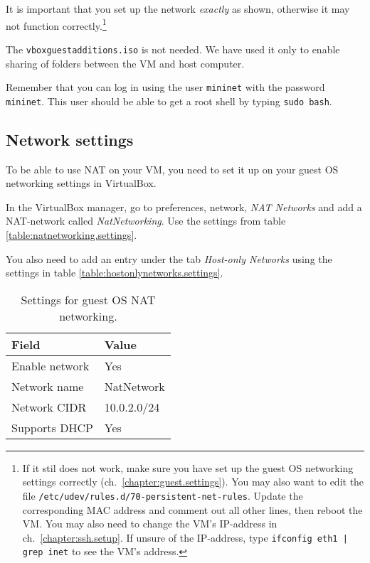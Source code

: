 It is important that you set up the network
\textit{exactly} as shown, otherwise it may not function correctly.\footnote{
  If it stil does not work, make sure you have set up the guest OS
    networking settings correctly (ch.~\vref{chapter:guest.settings}).
  You may also want to edit the file
  \texttt{/etc/udev/rules.d/70-persistent-net-rules}.
  Update the corresponding MAC address and comment out all other lines, then
  reboot the VM.
   You may also need to change the VM's IP-address in
  ch.~\vref{chapter:ssh.setup}. If unsure of the IP-address, type
  \texttt{ifconfig eth1 | grep inet} to see the VM's address.
}

The \texttt{vboxguestadditions.iso} is not needed. We have used it only to
enable sharing of folders between the VM and host computer.

Remember that you can log in using the user \texttt{mininet} with the
password \texttt{mininet}.  This user should be able to get a root shell by
typing \texttt{sudo bash}.

\subsection{Network settings}
\label{chapter:guest.settings}

To be able to use \ac{NAT} on your VM, you need to set it up on your guest
OS networking settings in VirtualBox.

In the VirtualBox manager, go to preferences, network, \textit{NAT Networks}
and add a \acs{NAT}-network called \textit{NatNetworking}. Use the settings
from table \vref{table:natnetworking.settings}.

You also need to add an entry under the tab \textit{Host-only Networks}
using the settings in table
\vref{table:hostonlynetworks.settings}.

\begin{table}[H]
  \centering
  \begin{tabular}{ll}
    \hline \textbf{Field} & \textbf{Value} \\
    \hline
      Enable network & Yes \\
      Network name & NatNetwork \\
      Network CIDR & 10.0.2.0/24 \\
      Supports DHCP & Yes \\
    \hline
  \end{tabular}
  \caption{Settings for guest OS NAT networking.}
  \label{table:natnetworking.settings}
\end{table}

